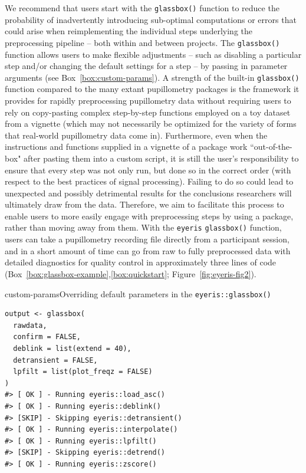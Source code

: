 We recommend that users start with the \texttt{glassbox()} function to reduce the probability of inadvertently introducing sub-optimal computations or errors that could arise when reimplementing the individual steps underlying the preprocessing pipeline – both within and between projects. The \texttt{glassbox()} function allows users to make flexible adjustments – such as disabling a particular step and/or changing the default settings for a step – by passing in parameter arguments (see Box~\ref{box:custom-params}). A strength of the built-in \texttt{glassbox()} function compared to the many extant pupillometry packages is the framework it provides for rapidly preprocessing pupillometry data without requiring users to rely on copy-pasting complex step-by-step functions employed on a toy dataset from a vignette (which may not necessarily be optimized for the variety of forms that real-world pupillometry data come in). Furthermore, even when the instructions and functions supplied in a vignette of a package work ``out-of-the-box" after pasting them into a custom script, it is still the user’s responsibility to ensure that every step was not only run, but done so in the correct order (with respect to the best practices of signal processing). Failing to do so could lead to unexpected and possibly detrimental results for the conclusions researchers will ultimately draw from the data. Therefore, we aim to facilitate this process to enable users to more easily engage with preprocessing steps by using a package, rather than moving away from them. With the \texttt{eyeris} \texttt{glassbox()} function, users can take a pupillometry recording file directly from a participant session, and in a short amount of time can go from raw to fully preprocessed data with detailed diagnostics for quality control in approximately three lines of code (Box~\ref{box:glassbox-example},\ref{box:quickstart}; Figure~\ref{fig:eyeris-fig2}).

\begin{eyerisbox}{custom-params}{Overriding default parameters in the \texttt{eyeris::glassbox()}}
\begin{lstlisting}
output <- glassbox(
  rawdata,
  confirm = FALSE,
  deblink = list(extend = 40),
  detransient = FALSE,
  lpfilt = list(plot_freqz = FALSE)
)
#> [ OK ] - Running eyeris::load_asc()
#> [ OK ] - Running eyeris::deblink()
#> [SKIP] - Skipping eyeris::detransient()
#> [ OK ] - Running eyeris::interpolate()
#> [ OK ] - Running eyeris::lpfilt()
#> [SKIP] - Skipping eyeris::detrend()
#> [ OK ] - Running eyeris::zscore()
\end{lstlisting}
\end{eyerisbox}

